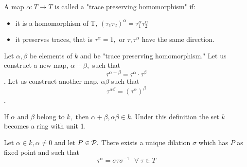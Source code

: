\begin{definition}
    A map $\alpha : T \rightarrow T$ is called a "trace preserving homomorphism" if:
    \begin{itemize}
        \item it is a homomorphism of T, $(\tau_1\tau_2)^{\alpha} = \tau_1^{\alpha}\tau_2^{\alpha} $
        \item it preserves traces, that is $\tau^{\alpha} = 1,$ or $\tau, \tau^{\alpha}$ have the same direction.
    \end{itemize}
\end{definition}

\begin{definition}
    Let $\alpha, \beta$ be elements of $k$ and be "trace preserving homomorphism." Let us construct a new map, $\alpha + \beta,$ such that 
    \[ \tau^{\alpha+\beta} = \tau^{\alpha} \cdot \tau^{\beta} \].
    Let us construct another map, $\alpha \beta$ such that
    \[ \tau^{\alpha\beta} = (\tau^{\alpha} )^{\beta} \].
\end{definition}

\begin{theorem}
    If $\alpha$ and $\beta$ belong to $k,$ then $ \alpha+\beta, {\alpha\beta} \in k.$ Under this definition the set $k$ becomes a ring with unit 1.
\end{theorem}

\begin{theorem}
    Let $\alpha \in k, \alpha \neq 0$ and let $P \in \mathcal{P}.$ There exists a unique dilation $\sigma$ which has $P$ as fixed point and such that 
    \[ \tau^\alpha = \sigma \tau \sigma^{-1} \: \: \: \forall \;\tau\in T \]
\end{theorem}

